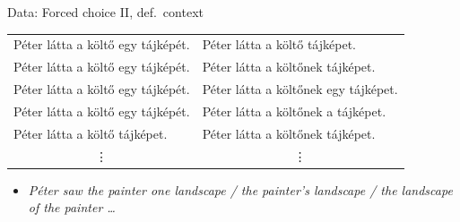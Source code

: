 \documentclass[12pt]{beamer}
\begin{document}
\begin{frame}{Data: Forced choice II, def.\ context}


{\small
\hspace{-.5cm}\begin{tabulary}{1\linewidth}{ll}
Péter látta a költő \alert{egy} tájképét. & Péter látta a költő tájképet.\\
Péter látta a költő \alert{egy} tájképét. & Péter látta a költő\textcolor{red!70!black}{nek} tájképet.\\
Péter látta a költő \alert{egy} tájképét. & Péter látta a költő\textcolor{red!70!black}{nek} \alert{egy} tájképet.\\
Péter látta a költő \alert{egy} tájképét. & Péter látta a költő\textcolor{red!70!black}{nek} \textcolor{green!70!black}{a} tájképet.\\
Péter látta a költő tájképet.     & Péter látta a költő\textcolor{red!70!black}{nek} tájképet.\\
 & \\
\end{tabulary}
}

\begin{itemize}
    \item \emph{Péter saw the painter \alert{one} landscape / the painter's landscape / \textcolor{green!70!black}{the} landscape \textcolor{red!70!black}{of the} painter \dots}
\end{itemize}

\end{frame}
\end{document}
